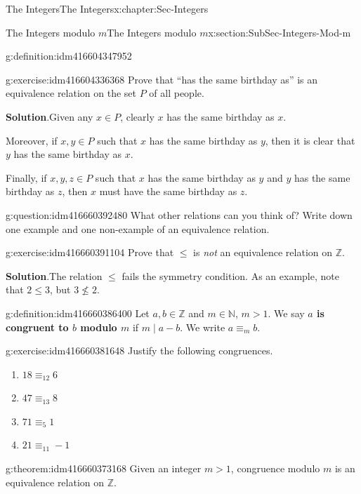 \documentclass[oneside,10pt,]{book}
\newcommand{\terminology}[1]{\textbf{#1}}
\numberwithin{equation}{section}
\renewcommand{\le}{\leqslant}
\def\Z{{\mathbb Z}}
\def\N{{\mathbb N}}
\begin{document}
\begin{chapterptx}{The Integers}{}{The Integers}{}{}{x:chapter:Sec-Integers}
\begin{sectionptx}{The Integers modulo \(m\)}{}{The Integers modulo \(m\)}{}{}{x:section:SubSec-Integers-Mod-m}
\begin{definition}{}{g:definition:idm416604347952}
\end{definition}
\begin{inlineexercise}{}{g:exercise:idm416604336368}%
Prove that ``has the same birthday as'' is an equivalence relation on the set \(P\) of all people.%
\par\smallskip%
\noindent\textbf{Solution}.\hypertarget{g:solution:idm416604334320}{}\quad{}Given any \(x\in P\), clearly \(x\) has the same birthday as \(x\).%
\par
Moreover, if \(x,y\in P\) such that \(x\) has the same birthday as \(y\), then it is clear that \(y\) has the same birthday as \(x\).%
\par
Finally, if \(x,y,z\in P\) such that \(x\) has the same birthday as \(y\) and \(y\) has the same birthday as \(z\), then \(x\) must have the same birthday as \(z\).%
\end{inlineexercise}
\begin{question}{}{g:question:idm416660392480}%
What other relations can you think of? Write down one example and one non-example of an equivalence relation.%
\end{question}
\begin{inlineexercise}{}{g:exercise:idm416660391104}%
Prove that \(\le\) is \emph{not} an equivalence relation on \(\Z\).%
\par\smallskip%
\noindent\textbf{Solution}.\hypertarget{g:solution:idm416660388704}{}\quad{}The relation \(\le\) fails the symmetry condition. As an example, note that \(2 \le 3\), but \(3\not\le 2\).%
\end{inlineexercise}
\begin{definition}{}{g:definition:idm416660386400}%
Let \(a,b\in \Z\) and \(m \in \N\), \(m > 1\). We say \terminology{\(a\) is congruent to \(b\) modulo \(m\)} if \(m\mid a-b\). We write \(a \equiv_m b\).%
\end{definition}
\begin{inlineexercise}{}{g:exercise:idm416660381648}%
Justify the following congruences.%
\begin{enumerate}
\item{}\(18 \equiv_{12} 6\)%
\item{}\(47 \equiv_{13} 8\)%
\item{}\(71 \equiv_5 1\)%
\item{}\(21 \equiv_{11} -1\)%
\end{enumerate}
%
\end{inlineexercise}
\begin{theorem}{}{}{g:theorem:idm416660373168}%
Given an integer \(m > 1\), congruence modulo \(m\) is an equivalence relation on \(\Z\).%

\end{theorem}
\end{sectionptx}
\end{chapterptx}
\end{document}
